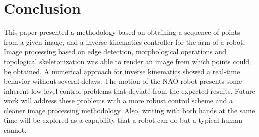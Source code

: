 \documentclass[conference]{IEEEtran}
\begin{document}



\section{Conclusion}
\label{sec:conclusion}
This paper presented a methodology based on obtaining a sequence of points from a given image, and a inverse kinematics controller for the arm of a robot. Image processing based on edge detection, morphological operations and topological skeletonization was able to render an image from which points could be obtained. A numerical approach for inverse kinematics showed a real-time behavior without several delays. The motion of the NAO robot presents some inherent low-level control problems that deviate from the expected results. Future work will address these problems with a more robust control scheme and a cleaner image processing methodology. Also, writing with both hands at the same time will be explored as a capability that a robot can do but a typical human cannot.



\end{document}
